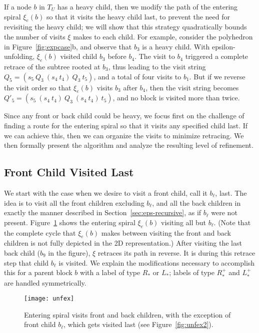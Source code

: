 \documentclass[11pt]{article}
\def\nothing{\ast}
\begin{document}
If a node $b$ in $T_U$ has a heavy child, then we modify the
path of the entering spiral $\xi_e(b)$ so
that it visits the heavy child last, to prevent the need for revisiting the heavy child; we will show that this strategy quadratically bounds the
number of visits $\xi$ makes to each child.
For example, consider the polyhedron in Figure~\ref{fig:expcase}b, and observe that
$b_3$ is a heavy child. With epsilon-unfolding, $\xi_e(b)$ visited child $b_3$
before $b_4$. The visit to $b_4$ triggered a complete retrace of the subtree rooted
at $b_3$, thus leading to the visit string $Q_5 = (s_5~Q_3~ (s_4~t_4)~Q_3~ t_5)$,
and a total of four visits to $b_1$.
But if we reverse the visit order so that $\xi_e(b)$ visits $b_3$ after $b_4$,
then the visit
string becomes $Q'_5 = (s_5~(s_4~t_4)~Q_3~(s_4~t_4)~t_5)$, and no
block is visited more than twice.


Since any front or back child could be heavy, we focus first on the challenge of
finding a route for the entering spiral so that it visits any specified child
last.
If we can achieve this, then we can organize the visits to minimize
retracing.
We then
formally present the algorithm and
analyze the resulting level of refinement.

\subsection{Front Child Visited Last}
\label{sec:heavyfront}

We start with the case when we desire to visit
a front child, call it $b_\ell$, last.
The idea is to visit all the front children excluding $b_\ell$,
and all the back children in exactly the manner described in Section~\ref{sec:eps-recursive}, as if $b_\ell$ were not present.
Figure~\ref{fig:unfex} shows the entering spiral $\xi_e(b)$ visiting all
but $b_\ell$.
(Note that the complete cycle that $\xi_e(b)$ makes between
 visiting the front and back children is not fully depicted in the
2D representation.)
After visiting the last back child ($b_9$ in the figure), $\xi$ retraces its
path in reverse.
It is during this retrace step that child $b_\ell$ is visited.
We explain the modifications necessary to accomplish this for a parent block
$b$ with a label of type $R_{\nothing}$ or $L_{\nothing}$; labels of type $R^+_{\nothing}$ and $L^+_{\nothing}$ are handled symmetrically.
\begin{figure}[htbp]
\centering
\texttt{[image: unfex]}
\caption{Entering spiral  visits front and back children, with the exception of front child $b_\ell$,
which gets visited last (see Figure~\ref{fig:unfex2}).}
\label{fig:unfex}
\end{figure}
\end{document}
